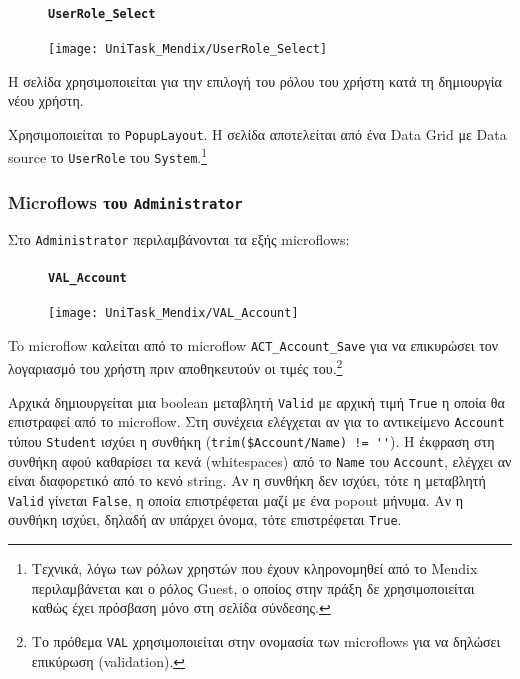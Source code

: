                 \begin{figure}[H] \noindent
                    \paragraph{\texttt{UserRole\_Select}}
                    \begin{center}
                        \texttt{[image: UniTask\_Mendix/UserRole\_Select]}
                    \end{center}
                \end{figure}

                    Η σελίδα χρησιμοποιείται για την επιλογή του ρόλου του χρήστη κατά τη δημιουργία νέου χρήστη.

                    Χρησιμοποιείται το \texttt{PopupLayout}. Η σελίδα αποτελείται από ένα Data Grid με Data source το \texttt{UserRole} του \texttt{System}.\footnote{Τεχνικά, λόγω των ρόλων χρηστών που έχουν κληρονομηθεί από το Mendix περιλαμβάνεται και ο ρόλος Guest, ο οποίος στην πράξη δε χρησιμοποιείται καθώς έχει πρόσβαση μόνο στη σελίδα σύνδεσης.}

            \subsubsection{Microflows του \texttt{Administrator}}
                Στο \texttt{Administrator} περιλαμβάνονται τα εξής microflows:

                \begin{figure}[H] \noindent
                    \paragraph{\texttt{VAL\_Account}}
                    \begin{center}
                        \texttt{[image: UniTask\_Mendix/VAL\_Account]}
                    \end{center}
                \end{figure}

                    To microflow καλείται από το microflow \texttt{ACT\_Account\_Save} για να επικυρώσει τον λογαριασμό του χρήστη πριν αποθηκευτούν οι τιμές του.\footnote{Το πρόθεμα \texttt{VAL} χρησιμοποιείται στην ονομασία των microflows για να δηλώσει επικύρωση (validation).}

                    Αρχικά δημιουργείται μια boolean μεταβλητή \texttt{Valid} με αρχική τιμή \texttt{True} η οποία θα επιστραφεί από το microflow. Στη συνέχεια ελέγχεται αν για το αντικείμενο \texttt{Account} τύπου \texttt{Student} ισχύει η συνθήκη (\verb|trim($Account/Name) != ''|). Η έκφραση στη συνθήκη αφού καθαρίσει τα κενά (whitespaces) από το \texttt{Name} του \texttt{Account}, ελέγχει αν είναι διαφορετικό από το κενό string. Αν η συνθήκη δεν ισχύει, τότε η μεταβλητή \texttt{Valid} γίνεται \texttt{False}, η οποία επιστρέφεται μαζί με ένα popout μήνυμα. Αν η συνθήκη ισχύει, δηλαδή αν υπάρχει όνομα, τότε επιστρέφεται \texttt{True}.

